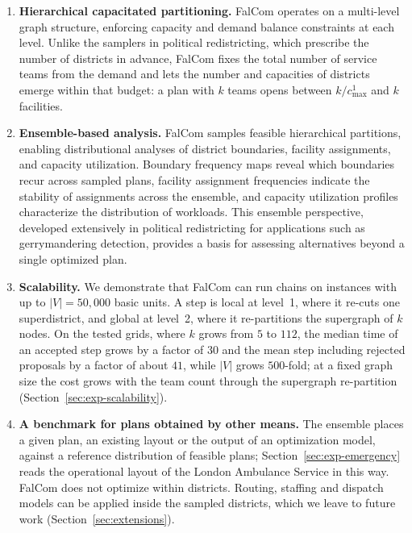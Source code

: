 \documentclass[preprint,12pt,authoryear]{elsarticle}
\theoremstyle{definition}
\begin{document}
\begin{enumerate}[nosep, label=(\roman*)]
     \item \textbf{Hierarchical capacitated partitioning.}
        FalCom operates on a multi-level graph structure, enforcing
        capacity and demand balance constraints at each level. Unlike the samplers in political redistricting, which prescribe the number of districts in advance, FalCom fixes the total number of service teams from the demand and lets the number and capacities of districts emerge within that budget: a plan with $k$ teams opens between $k/c^1_{\max}$ and $k$ facilities.


    \item \textbf{Ensemble-based analysis.} FalCom samples feasible hierarchical 
        partitions, enabling distributional analyses of district boundaries, facility
        assignments, and capacity utilization. Boundary frequency maps
        reveal which boundaries recur across sampled plans, facility
        assignment frequencies indicate the stability of assignments
        across the ensemble, and capacity utilization profiles characterize
        the distribution of workloads. This ensemble perspective, developed
        extensively in political redistricting for applications such as
        gerrymandering detection, provides a basis for assessing alternatives 
        beyond a single optimized plan.

    \item \textbf{Scalability.}  We demonstrate that FalCom can run chains on 
        instances with up to $|V| = 50{,}000$ basic units. A step is local at level~1, where it re-cuts one superdistrict, and global at level~2, where it re-partitions the supergraph of $k$ nodes. On the tested grids, where $k$ grows from $5$ to $112$, the median time of an accepted step grows by a factor of $30$ and the mean step including rejected proposals by a factor of about $41$, while $|V|$ grows $500$-fold; at a fixed graph size the cost grows with the team count through the supergraph re-partition (Section~\ref{sec:exp-scalability}).

    \item \textbf{A benchmark for plans obtained by other means.} The ensemble places a given plan, an existing layout or the output of an optimization model, against a reference distribution of feasible plans; Section~\ref{sec:exp-emergency} reads the operational layout of the London Ambulance Service in this way. FalCom does not optimize within districts. Routing, staffing and dispatch models can be applied inside the sampled districts, which we leave to future work (Section~\ref{sec:extensions}).
    \end{enumerate}
\vspace{2mm}
\end{document}
